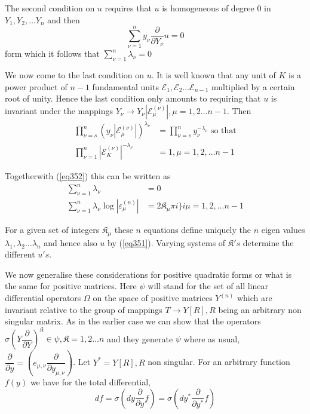 The second condition on $u$ requires that $u$ is homogeneous of degree
$0$ in $Y_1 , Y_2, \ldots Y_n$ and then  
\begin{equation*}
\sum^n_{\nu = 1} y_\nu \frac{\partial}{\partial Y_\nu} u = 0
\tag{352}\label{eq352}  
\end{equation*}
form which it follows that $\sum^n_{\nu = 1} \lambda_\nu = 0$ 

We now come to the last condition on $u$. It is well known that any
unit of $K$ is a power product of $n-1$ fundamental units $
\mathscr{E}_1 , \mathscr{E}_2 \ldots \mathscr{E}_{n-1}$ multiplied by
a certain root of unity. Hence the last condition only amounts to
requiring that $u$ is invariant under the mappings \break $Y_\nu \rightarrow
Y_\nu |\mathscr{E}^{(\nu)}_{\mu}|, \mu = 1,2 \ldots n - 1$. Then  
\begin{align*}
\prod^n_{\nu = s} (y_\nu |\mathscr{E}^{(\nu)}_{\mu}|)^{\lambda_\nu} &
= \prod^n_{\nu = s} y^{- \lambda_\nu}_{\nu} \text{ so that} \\ 
\prod^n_{\nu = 1}| \mathscr{E}^{(\nu)}_{K}| ^{-\lambda_\nu} & = 1, \mu
= 1,2, \ldots n -1  
\end{align*}

Together\pageoriginale with (\ref{eq352}) this can be written as  
\begin{align*}
\sum^n_{\nu = 1} \lambda_\nu & = 0 \\ 
\sum^n_{\nu = 1} \lambda_\nu \log | \varepsilon^{(n)}_{\mu}| & = 2
\mathfrak{K}_\mu \pi i \big \} i \mu = 1,2, \ldots n -1 
\end{align*}

For a given set of integers $\mathfrak{K}_\mu$ these $n$ equations
define uniquely the $n$ eigen values $\lambda_1 , \lambda_2 \ldots
\lambda_n$ and hence also $u$ by (\ref{eq351}). Varying systems of
$\mathfrak{K}'s$ determine the different $u 's$. 

We now generalise these considerations for positive quadratic forms or
what is the same for positive matrices. Here $\psi$ will stand
for the set of all linear differential operators $\Omega$ on the space
of positive matrices $Y^{(n)}$ which are invariant relative to the
group of mappings $T \rightarrow Y [R], R$ being an arbitrary non
singular matrix. As in the earlier case we can show that the operators
$\sigma (Y \dfrac{\partial}{\partial Y})^\mathfrak{K} \in \psi,
\mathfrak{K} = 1,2 \ldots n$ and they generate $\psi$ where as
usual, $\dfrac{\partial}{\partial y} = (e_{\mu
  ,\nu}\dfrac{\partial}{\partial y_{\mu, \nu}})$. Let $Y^* = Y [R], R$
non singular. For an arbitrary function $f(y)$ we have for the
total differential,  
$$
df = \sigma (d y \frac{\partial}{\partial y} f) = \sigma( d y^*
\frac{\partial}{\partial y^*}f) 
$$

